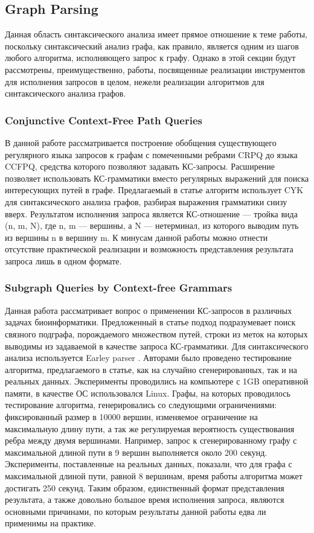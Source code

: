 \documentclass[14pt]{matmex-diploma-custom}
\begin{document}
	\subsection{Graph Parsing}
	Данная область синтаксического анализа имеет прямое отношение к теме работы, поскольку синтаксический анализ графа, как правило, является одним из шагов любого алгоритма, исполняющего запрос к графу. Однако в этой секции будут рассмотрены, преимущественно, работы, посвященные реализации инструментов для исполнения запросов в целом, нежели реализации алгоритмов для синтаксического анализа графов.
		\subsubsection{Conjunctive Context-Free Path Queries}
		В данной работе рассматривается построение обобщения существующего регулярного языка запросов к графам с помеченными ребрами CRPQ до языка CCFPQ, средства которого позволяют задавать КС-запросы. Расширение позволяет использовать КС-грамматики вместо регулярных выражений для поиска интересующих путей в графе. Предлагаемый в статье алгоритм использует CYK для синтаксического анализа графов, разбирая выражения грамматики снизу вверх. Результатом исполнения запроса является КС-отношение --- тройка вида (n, m, N), где n, m --- вершины, а N --- нетерминал, из которого выводим путь из вершины n в вершину m. К минусам данной работы можно отнести отсутствие практической реализации и возможность представления результата запроса лишь в одном формате.
		\subsubsection{Subgraph Queries by Context-free Grammars}
		Данная работа рассматривает вопрос о применении КС-запросов в различных задачах биоинформатики. Предложенный в статье подход подразумевает поиск связного подграфа, порождаемого множеством путей, строки из меток на которых выводимы из задаваемой в качестве запроса КС-грамматики. Для синтаксического анализа используется Earley parser \cite{}. Авторами было проведено тестирование алгоритма, предлагаемого в статье, как на случайно сгенерированных, так и на реальных данных. Эксперименты проводились на компьютере с 1GB оперативной памяти, в качестве ОС использовался Linux. Графы, на которых проводилось тестирование алгоритма, генерировались со следующими ограничениями: фиксированный размер в 10000 вершин, изменяемое ограничение на максимальную длину пути, а так же регулируемая вероятность существования ребра между двумя вершинами. Например, запрос к сгенерированному графу с максимальной длиной пути в 9 вершин выполняется около 200 секунд. Эксперименты, поставленные на реальных данных, показали, что для графа с максимальной длиной пути, равной 8 вершинам, время работы алгоритма может достигать 250 секунд. Таким образом, единственный формат представления результата, а также довольно большое время исполнения запроса, являются основными причинами, по которым результаты данной работы едва ли применимы на практике. 
\end{document}
